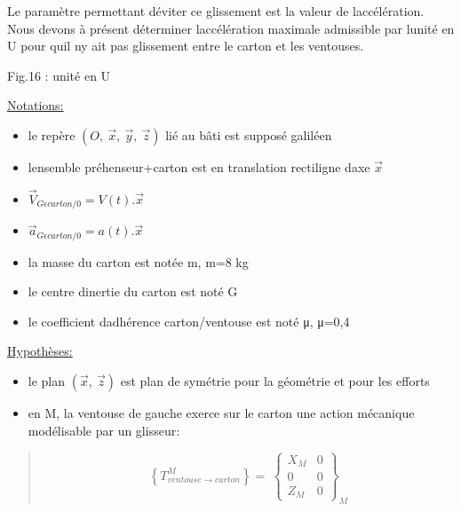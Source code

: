 Le paramètre permettant d\textquotesingle éviter ce glissement est la valeur de l\textquotesingle accélération. Nous devons à présent déterminer l\textquotesingle accélération maximale admissible par l\textquotesingle unité en U pour qu\textquotesingle il n\textquotesingle y ait pas glissement entre le carton et les ventouses.

Fig.16 : unité en U

\ul{Notations:}

\begin{itemize}
\item
  le repère \((O,\ \overrightarrow{x},\ \overrightarrow{y},\ \overrightarrow{z})\) lié au bâti est supposé galiléen
\item
  l\textquotesingle ensemble préhenseur+carton est en translation rectiligne d\textquotesingle axe \(\overrightarrow{x}\)
\item
  \({\overrightarrow{V}}_{G\epsilon carton/0} = V(t).\overrightarrow{x}\)
\item
  \({\overrightarrow{a}}_{G\epsilon carton/0} = a(t).\overrightarrow{x}\)
\end{itemize}

\begin{itemize}
\tightlist
\item
  la masse du carton est notée m, m=8 kg
\end{itemize}

\begin{itemize}
\tightlist
\item
  le centre d\textquotesingle inertie du carton est noté G
\end{itemize}

\begin{itemize}
\tightlist
\item
  le coefficient d\textquotesingle adhérence carton/ventouse est noté μ, μ=0,4
\end{itemize}

\ul{Hypothèses:}

\begin{itemize}
\item
  le plan \((\overrightarrow{x},\ \overrightarrow{z})\) est plan de symétrie pour la géométrie et pour les efforts
\item
  en M, la ventouse de gauche exerce sur le carton une action mécanique modélisable par un glisseur:
\end{itemize}

\begin{quote}
\[\left\{ T_{ventouse \rightarrow carton}^{M} \right\} = \ \begin{Bmatrix}
X_{M} & 0 \\
0 & 0 \\
Z_{M} & 0
\end{Bmatrix}_{M}\]
\end{quote}

